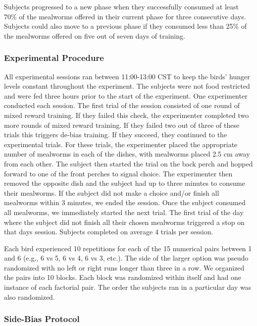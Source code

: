 \documentclass[
  english,
  ,doc,floatsintext]{apa6}
\begin{document}
Subjects progressed to a new phase when they successfully consumed at least 70\% of the mealworms offered in their current phase for three consecutive days. Subjects could also move to a previous phase if they consumed less than 25\% of the mealworms offered on five out of seven days of training.

\hypertarget{experimental-procedure}{%
\subsubsection{Experimental Procedure}\label{experimental-procedure}}

All experimental sessions ran between 11:00-13:00 CST to keep the birds' hunger levels constant throughout the experiment. The subjects were not food restricted and were fed three hours prior to the start of the experiment. One experimenter conducted each session. The first trial of the session consisted of one round of mixed reward training. If they failed this check, the experimenter completed two more rounds of mixed reward training. If they failed two out of three of these trials this triggers de-bias training. If they succeed, they continued to the experimental trials. For these trials, the experimenter placed the appropriate number of mealworms in each of the dishes, with mealworms placed 2.5 cm away from each other. The subject then started the trial on the back perch and hopped forward to one of the front perches to signal choice. The experimenter then removed the opposite dish and the subject had up to three minutes to consume their mealworms. If the subject did not make a choice and/or finish all mealworms within 3 minutes, we ended the session. Once the subject consumed all mealworms, we immediately started the next trial. The first trial of the day where the subject did not finish all their chosen mealworms triggered a stop on that days session. Subjects completed on average 4 trials per session.

Each bird experienced 10 repetitions for each of the 15 numerical pairs between 1 and 6 (e.g., 6 vs 5, 6 vs 4, 6 vs 3, etc.). The side of the larger option was pseudo randomized with no left or right runs longer than three in a row. We organized the pairs into 10 blocks. Each block was randomized within itself and had one instance of each factorial pair. The order the subjects ran in a particular day was also randomized.

\hypertarget{side-bias-protocol}{%
\subsubsection{Side-Bias Protocol}\label{side-bias-protocol}}
\end{document}
